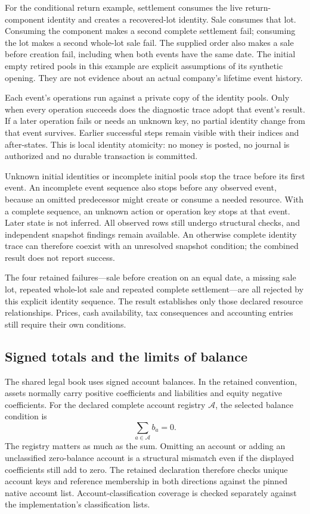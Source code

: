 For the conditional return example, settlement consumes the live return-component
identity and creates a recovered-lot identity. Sale consumes that lot. Consuming
the component makes a second complete settlement fail; consuming the lot makes
a second whole-lot sale fail. The supplied order also makes a sale before creation
fail, including when both events have the same date. The initial empty retired
pools in this example are explicit assumptions of its synthetic opening. They
are not evidence about an actual company's lifetime event history.

Each event's operations run against a private copy of the identity pools. Only
when every operation succeeds does the diagnostic trace adopt that event's
result. If a later operation fails or needs an unknown key, no partial identity
change from that event survives. Earlier successful steps remain visible with
their indices and after-states. This is local identity atomicity: no money is
posted, no journal is authorized and no durable transaction is committed.

Unknown initial identities or incomplete initial pools stop the trace before its
first event. An incomplete event sequence also stops before any observed event,
because an omitted predecessor might create or consume a needed resource. With
a complete sequence, an unknown action or operation key stops at that event.
Later state is not inferred. All observed rows still undergo structural checks,
and independent snapshot findings remain available. An otherwise complete
identity trace can therefore coexist with an unresolved snapshot condition;
the combined result does not report success.

The four retained failures---sale before creation on an equal date, a missing
sale lot, repeated whole-lot sale and repeated complete settlement---are all
rejected by this explicit identity sequence. The result establishes only those
declared resource relationships. Prices, cash availability, tax consequences
and accounting entries still require their own conditions.

\subsection{Signed totals and the limits of balance}

The shared legal book uses signed account balances. In the retained convention,
assets normally carry positive coefficients and liabilities and equity negative
coefficients. For the declared complete account registry $\mathcal A$, the
selected balance condition is
\[
  \sum_{a\in\mathcal A} b_a=0.
\]
The registry matters as much as the sum. Omitting an account or adding an
unclassified zero-balance account is a structural mismatch even if the displayed
coefficients still add to zero. The retained declaration therefore checks unique
account keys and reference membership in both directions against the pinned
native account list. Account-classification coverage is checked separately
against the implementation's classification lists.

